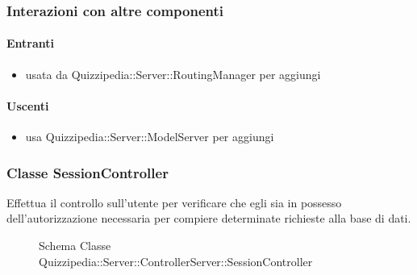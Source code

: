 \subsubsection{Interazioni con altre componenti}
\paragraph{Entranti}
\begin{itemize}
\item usata da Quizzipedia::Server::RoutingManager per aggiungi
\end{itemize}
\paragraph{Uscenti}
\begin{itemize}
\item usa Quizzipedia::Server::ModelServer per aggiungi
\end{itemize}
\subsubsection{Classe SessionController}
Effettua il controllo sull'utente per verificare che egli sia in possesso dell'autorizzazione necessaria per compiere determinate richieste alla base di dati.
\begin{figure}[H]
\centering
\noindent{}
\caption[Schema Classe SessionController]{Schema Classe Quizzipedia::Server::ControllerServer::SessionController}
\end{figure}
